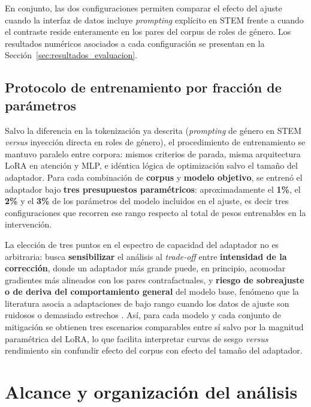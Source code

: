 \documentclass[12pt,a4paper]{report}
\begin{document}
En conjunto, las dos configuraciones permiten comparar el efecto del ajuste cuando la interfaz de datos incluye \emph{prompting} explícito en STEM frente a cuando el contraste reside enteramente en los pares del corpus de roles de género. Los resultados numéricos asociados a cada configuración se presentan en la Sección~\ref{sec:resultados_evaluacion}.

\subsection{Protocolo de entrenamiento por fracción de parámetros}
\label{sec:protocolo_parametrico}

Salvo la diferencia en la tokenización ya descrita (\emph{prompting} de género en STEM \emph{versus} inyección directa en roles de género), el procedimiento de entrenamiento se mantuvo paralelo entre corpora: mismos criterios de parada, misma arquitectura LoRA en atención y MLP, e idéntica lógica de optimización salvo el tamaño del adaptador. Para cada combinación de \textbf{corpus} y \textbf{modelo objetivo}, se entrenó el adaptador bajo \textbf{tres presupuestos paramétricos}: aproximadamente el \textbf{1\%}, el \textbf{2\%} y el \textbf{3\%} de los parámetros del modelo incluidos en el ajuste, es decir tres configuraciones que recorren ese rango respecto al total de pesos entrenables en la intervención.

La elección de tres puntos en el espectro de capacidad del adaptador no es arbitraria: busca \textbf{sensibilizar} el análisis al \textit{trade-off} entre \textbf{intensidad de la corrección}, donde un adaptador más grande puede, en principio, acomodar gradientes más alineados con los pares contrafactuales, y \textbf{riesgo de sobreajuste o de deriva del comportamiento general} del modelo base, fenómeno que la literatura asocia a adaptaciones de bajo rango cuando los datos de ajuste son ruidosos o demasiado estrechos \cite{chang_ba-lora_2025}. Así, para cada modelo y cada conjunto de mitigación se obtienen tres escenarios comparables entre sí salvo por la magnitud paramétrica del LoRA, lo que facilita interpretar curvas de sesgo \emph{versus} rendimiento sin confundir efecto del corpus con efecto del tamaño del adaptador.


\section{Alcance y organización del análisis}
\label{sec:ex_alcance}
\label{sec:resultados_evaluacion}
\end{document}
